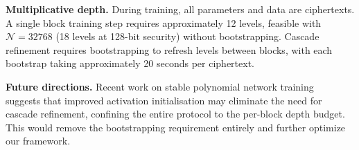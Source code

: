 \textbf{Multiplicative depth.} During training, all parameters and data are ciphertexts. A single block training step requires approximately 12 levels, feasible with $\mathcal{N}{=}32768$ (18 levels at 128-bit security) without bootstrapping. Cascade refinement requires bootstrapping to refresh levels between blocks, with each bootstrap taking approximately 20 seconds per ciphertext.

\textbf{Future directions.} Recent work on stable polynomial network training~\cite{agamennone2025polynomial, alhossain2025training} suggests that improved activation initialisation may eliminate the need for cascade refinement, confining the entire protocol to the per-block depth budget. This would remove the bootstrapping requirement entirely and further optimize our framework.










